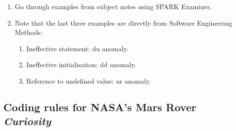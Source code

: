 \documentclass[11pt]{article}
\begin{document}
\begin{enumerate}
  \item Go through examples from subject notes using SPARK Examiner.

  \item Note that the last three examples are directly from Software Engineering Methods: 

   \begin{enumerate}
    \item Ineffective statement: du anomaly.
    \item Ineffective initialisation: dd anomaly.
    \item Reference to undefined value: ur anomaly.
   \end{enumerate}

\end{enumerate}

\pagebreak

\subsection*{Coding rules for NASA's Mars Rover \emph{Curiosity}}
\end{document}
